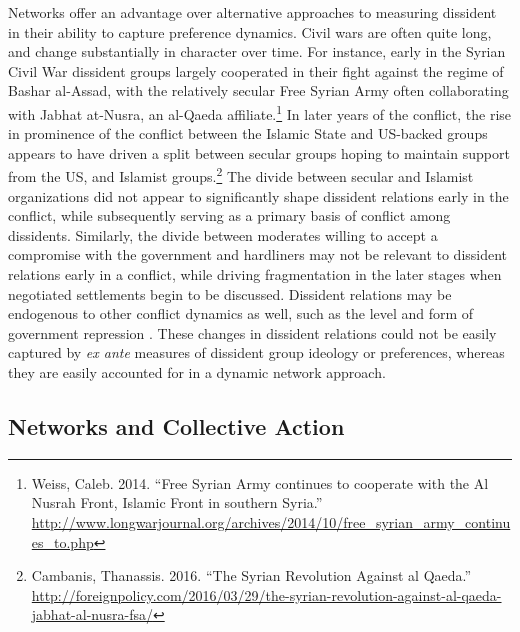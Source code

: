 Networks offer an advantage over alternative approaches to measuring dissident in their ability to capture preference dynamics. Civil wars are often quite long, and change substantially in character over time. For instance, early in the Syrian Civil War dissident groups largely cooperated in their fight against the regime of Bashar al-Assad, with the relatively secular Free Syrian Army often collaborating with Jabhat at-Nusra, an al-Qaeda affiliate.\footnote{Weiss, Caleb. 2014. ``Free Syrian Army continues to cooperate with the Al Nusrah Front, Islamic Front in southern Syria.'' \url{http://www.longwarjournal.org/archives/2014/10/free_syrian_army_continues_to.php}} In later years of the conflict, the rise in prominence of the conflict between the Islamic State and US-backed groups appears to have driven a split between secular groups hoping to maintain support from the US, and Islamist groups.\footnote{Cambanis, Thanassis. 2016. ``The Syrian Revolution Against al Qaeda.'' \url{http://foreignpolicy.com/2016/03/29/the-syrian-revolution-against-al-qaeda-jabhat-al-nusra-fsa/}} The divide between secular and Islamist organizations did not appear to significantly shape dissident relations early in the conflict, while subsequently serving as a primary basis of conflict among dissidents. Similarly, the divide between moderates willing to accept a compromise with the government and hardliners may not be relevant to dissident relations early in a conflict, while driving fragmentation in the later stages when negotiated settlements begin to be discussed. Dissident relations may be endogenous to other conflict dynamics as well, such as the level and form of government repression \citep{McLauchlin2012}. These changes in dissident relations could not be easily captured by \textit{ex ante} measures of dissident group ideology or preferences, whereas they are easily accounted for in a dynamic network approach. 

\subsection{Networks and Collective Action}


